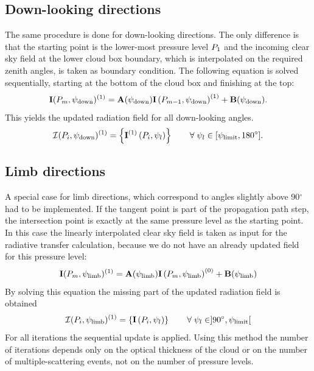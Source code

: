 \subsection{Down-looking directions}
The same procedure is done for down-looking directions.  The only
difference is that the starting point is the lower-most pressure level
$P_1$ and the incoming clear sky field at the lower cloud box boundary,
which is interpolated on the required zenith angles, is taken as
boundary condition.  The following equation is solved sequentially,
starting at the bottom of the cloud box and finishing at the top:
\begin{equation}
  {\bf I} ( P_{m},\psi_\mathrm{down} ) ^{(1)} = 
  \mathbf{A}(\psi_\mathrm{down}) {\bf I}\left( P_{m-1},\psi_\mathrm{down} \right)^{(1)} 
  + \mathbf{B}(\psi_\mathrm{down}).
\end{equation}
This yields the updated radiation field for all down-looking angles.
\begin{equation}
  {\mathcal I}(P_i, \psi_\mathrm{down})^{(1)} = \left\{ {\bf I}^{(1)} \left( P_i,\psi_l \right) \right\}  \qquad
  \forall \;  \psi_l \in [\psi_\mathrm{limit}, 180^\circ].
\end{equation}

\subsection{Limb directions}
A special case for limb directions, which correspond to angles
slightly above 90$^\circ$\, had to be implemented.  If the tangent
point is part of the propagation path step, the intersection point is
exactly at the same pressure level as the starting point.  In this
case the linearly interpolated clear sky field is taken as input for
the radiative transfer calculation, because we do not have an already
updated field for this pressure level:
\begin{equation}
  {\bf I} ( P_{m},\psi_\mathrm{limb} ) ^{(1)} =   
  \mathbf{A}(\psi_\mathrm{limb}) {\bf I}\left( P_{m},\psi_\mathrm{limb} \right)^{(0)} 
  + \mathbf{B}(\psi_\mathrm{limb})
\end{equation}
By solving this equation the missing part of the updated radiation
field is obtained
\begin{equation}
  {\mathcal I}(P_i, \psi_\mathrm{limb})^{(1)} = \left\{{\bf I} \left( P_i,\psi_l \right) \right\}  \qquad
  \forall \;  \psi_l \in  ]90^\circ, \psi_\mathrm{limit}[
\end{equation}
For all iterations the sequential update is applied. Using this method
the number of iterations depends only on the optical thickness of the
cloud or on the number of multiple-scattering events, not on the
number of pressure levels.

